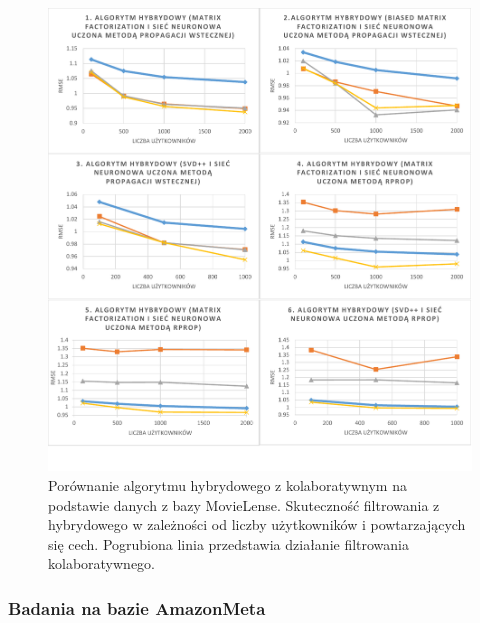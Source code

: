 \documentclass[twoside]{iisthesis}
\begin{document}
		\begin{figure}[!ht]
			\centering
			\includegraphics[page=2,width=1\textwidth]{exphybrid_movielens2}
			\caption{Porównanie algorytmu hybrydowego z kolaboratywnym na podstawie danych z bazy MovieLense. Skuteczność filtrowania z hybrydowego w zależności od liczby użytkowników i powtarzających się cech. Pogrubiona linia przedstawia działanie filtrowania kolaboratywnego.}
			\label{fig:exphybrid_movielens2b}
		\end{figure}
		
		
		
		\subsubsection{Badania na bazie AmazonMeta}
		




\end{document}
